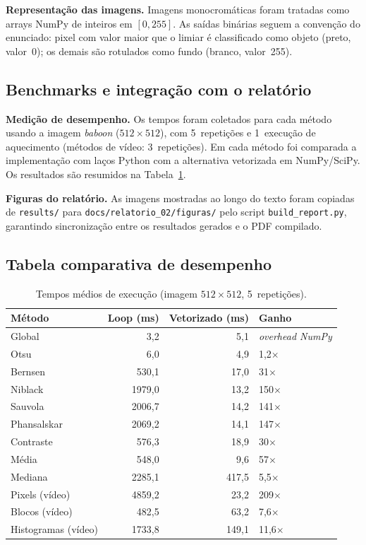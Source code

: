 \documentclass[12pt,a4paper]{article}
\newcommand{\arquivo}[1]{\nolinkurl{#1}}
\newcommand{\campo}[2]{\textbf{#1.} #2\par}
\begin{document}
\campo{Representação das imagens}{Imagens monocromáticas foram tratadas como arrays NumPy
de inteiros em $[0,255]$. As saídas binárias seguem a convenção do enunciado: pixel com
valor maior que o limiar é classificado como objeto (preto, valor~0); os demais são
rotulados como fundo (branco, valor~255).}

\subsection{Benchmarks e integração com o relatório}

\campo{Medição de desempenho}{Os tempos foram coletados para cada método usando a imagem
\textit{baboon} ($512\times 512$), com 5~repetições e 1~execução de aquecimento (métodos de
vídeo: 3~repetições). Em cada método foi comparada a implementação com laços Python com a
alternativa vetorizada em NumPy/SciPy. Os resultados são resumidos na
Tabela~\ref{tab:benchmark}.}

\campo{Figuras do relatório}{As imagens mostradas ao longo do texto foram copiadas de
\arquivo{results/} para \arquivo{docs/relatorio\_02/figuras/} pelo script
\arquivo{build\_report.py}, garantindo sincronização entre os resultados gerados e o PDF
compilado.}

\subsection{Tabela comparativa de desempenho}

\begin{table}[H]
\centering
\caption{Tempos médios de execução (imagem $512\times 512$, 5~repetições).}
\label{tab:benchmark}
\begin{tabular}{lrrl}
\toprule
\textbf{Método} & \textbf{Loop (ms)} & \textbf{Vetorizado (ms)} & \textbf{Ganho} \\
\midrule
Global              &    3{,}2  &   5{,}1  & \textit{overhead NumPy} \\
Otsu                &    6{,}0  &   4{,}9  & 1{,}2$\times$ \\
Bernsen             &  530{,}1  &  17{,}0  & 31$\times$ \\
Niblack             & 1979{,}0  &  13{,}2  & 150$\times$ \\
Sauvola             & 2006{,}7  &  14{,}2  & 141$\times$ \\
Phansalskar         & 2069{,}2  &  14{,}1  & 147$\times$ \\
Contraste           &  576{,}3  &  18{,}9  & 30$\times$ \\
Média               &  548{,}0  &   9{,}6  & 57$\times$ \\
Mediana             & 2285{,}1  & 417{,}5  & 5{,}5$\times$ \\
\midrule
Pixels (vídeo)      & 4859{,}2  &  23{,}2  & 209$\times$ \\
Blocos (vídeo)      &  482{,}5  &  63{,}2  & 7{,}6$\times$ \\
Histogramas (vídeo) & 1733{,}8  & 149{,}1  & 11{,}6$\times$ \\
\bottomrule
\end{tabular}
\end{table}
\end{document}
